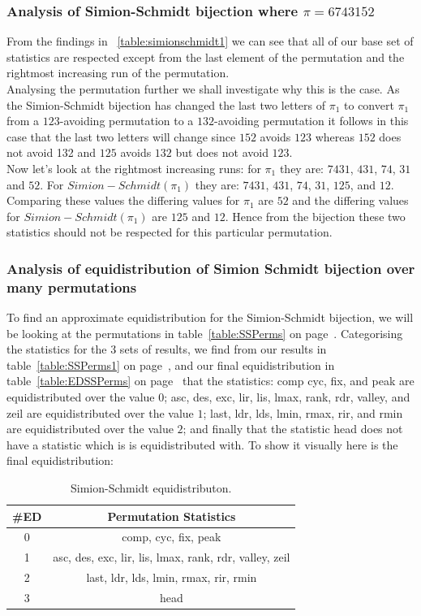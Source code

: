 \documentclass[12pt]{article}
\begin{document}
\subsubsection{Analysis of Simion-Schmidt bijection where $\pi = 6743152$}
From the findings in ~\ref{table:simionschmidt1} we can see that all of our base set of statistics are respected except from the last element of the permutation and the rightmost increasing run of the permutation.\\
Analysing the permutation further we shall investigate why this is the case. As the Simion-Schmidt bijection has changed the last two letters of $\pi_1$ to convert $\pi_1$ from a $123$-avoiding permutation to a $132$-avoiding permutation it follows in this case that the last two letters will change since $152$ avoids $123$ whereas $152$ does not avoid 132 and $125$ avoids $132$ but does not avoid $123$.\\
Now let's look at the rightmost increasing runs: for $\pi_1$ they are: $7431$, $431$, $74$, $31$ and $52$. For $Simion-Schmidt(\pi_1)$ they are:  $7431$, $431$, $74$, $31$, $125$, and $12$. Comparing these values the differing values for $\pi_1$ are $52$ and the differing values for $Simion-Schmidt(\pi_1)$ are $125$ and $12$. Hence from the bijection these two statistics should not be respected for this particular permutation. 
\subsubsection{Analysis of equidistribution of Simion Schmidt bijection over many permutations}
To find an approximate equidistribution for the Simion-Schmidt bijection, we will be looking at the permutations in table~\ref{table:SSPerms} on page~\pageref{table:SSPerms}. Categorising the statistics for the 3 sets of results, we find from our results in table~\ref{table:SSPerms1} on page~\pageref{table:SSPerms1}, and our final equidistribution in table~\ref{table:EDSSPerms} on page~\pageref{table:EDSSPerms} that the statistics: comp cyc, fix, and peak are equidistributed over the value $0$; asc, des, exc, lir, lis, lmax, rank, rdr, valley, and zeil are equidistributed over the value $1$; last, ldr, lds, lmin, rmax, rir, and rmin are equidistributed over the value $2$; and finally that the statistic head does not have a statistic which is is equidistributed with. To show it visually here is the final equidistribution:
\begin{table}[H]
\caption{Simion-Schmidt equidistributon.}
\begin{tabular}{c | c}
\hline\hline
\#ED & Permutation Statistics\\ [0.5ex]
\hline
0 & comp, cyc, fix, peak \\
\hline
1 & asc, des, exc, lir, lis, lmax, rank, rdr, valley, zeil  \\
\hline
2 & last, ldr, lds, lmin, rmax, rir, rmin \\
\hline
3 & head \\
\hline
\end{tabular}
\label{table:FinalEDSS}
\end{table}
\end{document}
